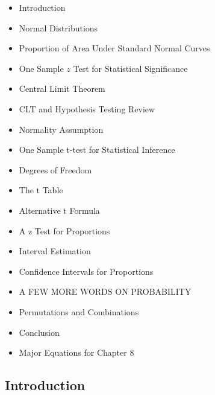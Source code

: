 \documentclass[]{article}
\begin{document}
\begin{itemize}
\itemsep1pt\parskip0pt
\item
  Introduction
\item
  Normal Distributions
\item
  Proportion of Area Under Standard Normal Curves
\item
  One Sample $z$ Test for Statistical Significance
\item
  Central Limit Theorem
\item
  CLT and Hypothesis Testing Review
\item
  Normality Assumption
\item
  One Sample t-test for Statistical Inference
\item
  Degrees of Freedom
\item
  The t Table
\item
  Alternative t Formula
\item
  A z Test for Proportions
\item
  Interval Estimation
\item
  Confidence Intervals for Proportions
\item
  A FEW MORE WORDS ON PROBABILITY
\item
  Permutations and Combinations
\item
  Conclusion
\item
  Major Equations for Chapter 8
\end{itemize}

\subsection{Introduction}\label{introduction}
\end{document}
